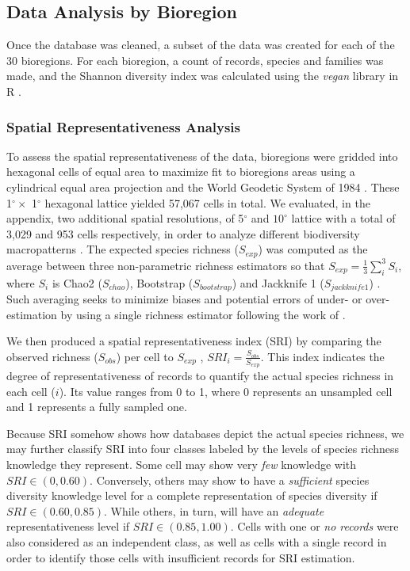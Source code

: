 \documentclass[12pt,authoryear]{elsarticle}
\begin{document}
\subsection{Data Analysis by Bioregion}
\label{sec:data-analysis}
Once the database was cleaned, a subset of the data was created for each of the 30 bioregions. For each bioregion, a count of records, species and families was made, and the Shannon diversity index was calculated using the \textit{vegan} library in R \citep{vegan}.

\subsubsection{Spatial Representativeness Analysis}
\label{sec:spat-repr-analys}
To assess the spatial representativeness of the data, bioregions were gridded into hexagonal cells of equal area to maximize fit to bioregions areas using a cylindrical equal area projection and the World Geodetic System of 1984 \cite{alo2021macroecology}. These 1$^{\circ} \times$ 1$^{\circ}$ hexagonal lattice yielded 57,067 cells in total. We evaluated, in the appendix, two additional spatial resolutions, of 5$^\circ$ and $10^\circ$ lattice with a total of 3,029 and 953 cells respectively, in order to analyze different biodiversity macropatterns \citep{tittensor2010global}. The expected species richness ($S_{exp}$) was computed as the average between three non-parametric richness estimators so that $S_{exp} = \frac{1}{3}\sum_i^3S_i $, where $S_i$ is Chao2 ($S_{chao}$), Bootstrap ($S_{bootstrap}$) and Jackknife 1 ($S_{jackknife1}$) \citep[see][for individual definition of indices]{magurran2011}. Such averaging seeks to minimize biases and potential errors of under- or over-estimation by using a single richness estimator following the work of \citep{mora2008completeness, troia2017}.

We then produced a spatial representativeness index (SRI) by comparing the observed richness ($S_{obs}$) per cell to $S_{exp}$ \citep{troia2017}, $SRI_i = \frac{S_{obs}}{S_{exp}}$. This index indicates the degree of representativeness of records to quantify the actual species richness in each cell ($i$). Its value ranges from 0 to 1, where 0 represents an unsampled cell and 1 represents a fully sampled one.

Because SRI somehow shows how databases depict the actual species richness, we may further classify SRI into four classes labeled by the levels of species richness knowledge they represent. Some cell may show very \textit{few} knowledge with $SRI \in (0,0.60)$. Conversely, others may show to have a \textit{sufficient} species diversity knowledge level for a complete representation of species diversity if $SRI \in (0.60,0.85)$. While others, in turn,  will have an \textit{adequate} representativeness level if $SRI \in (0.85,1.00)$. Cells with one or \textit{no records} were also considered as an independent class, as well as cells with a single record in order to identify those cells with insufficient records for SRI estimation.
\end{document}
